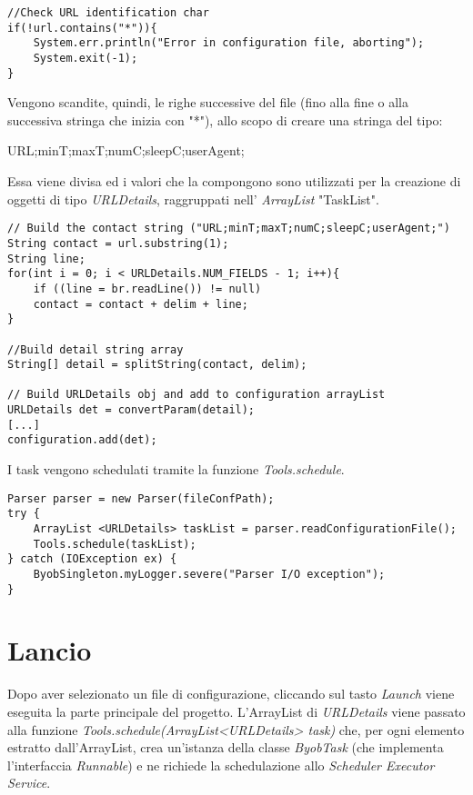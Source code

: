 \begin{lstlisting}
//Check URL identification char
if(!url.contains("*")){
	System.err.println("Error in configuration file, aborting");
	System.exit(-1);
}
\end{lstlisting}

Vengono scandite, quindi, le righe successive del file (fino alla fine o alla successiva stringa che inizia con "*"), allo scopo di creare una stringa del tipo:

\vspace{0.5cm}
\begin{normalsize}
	URL;minT;maxT;numC;sleepC;userAgent;
\end{normalsize}

\vspace{0.5cm}
Essa viene divisa ed i valori che la compongono sono utilizzati per la creazione di oggetti di tipo \textit{URLDetails}, raggruppati nell' \textit{ArrayList} "TaskList".

\begin{lstlisting}
// Build the contact string ("URL;minT;maxT;numC;sleepC;userAgent;")
String contact = url.substring(1);
String line;
for(int i = 0; i < URLDetails.NUM_FIELDS - 1; i++){
	if ((line = br.readLine()) != null)
	contact = contact + delim + line;
}

//Build detail string array
String[] detail = splitString(contact, delim);

// Build URLDetails obj and add to configuration arrayList
URLDetails det = convertParam(detail);
[...]
configuration.add(det);
\end{lstlisting}


I task vengono schedulati tramite la funzione \textit{Tools.schedule}.

\vspace{0.5cm}
\begin{lstlisting}
Parser parser = new Parser(fileConfPath);
try {
	ArrayList <URLDetails> taskList = parser.readConfigurationFile();
	Tools.schedule(taskList);
} catch (IOException ex) {
	ByobSingleton.myLogger.severe("Parser I/O exception");
}
\end{lstlisting}


\section{Lancio}
Dopo aver selezionato un file di configurazione, cliccando sul tasto \textit{Launch} viene eseguita la parte principale del progetto.
L'ArrayList di \textit{URLDetails} viene passato alla funzione \textit{Tools.schedule(ArrayList<URLDetails> task)} che, per ogni elemento estratto dall'ArrayList, crea un'istanza della classe \textit{ByobTask} (che implementa l'interfaccia \textit{Runnable}) e ne richiede la schedulazione allo \textit{Scheduler Executor Service}.

